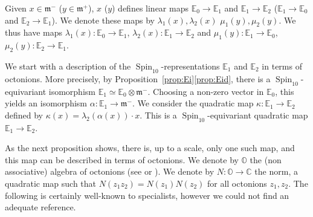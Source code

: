 \documentclass[10pt]{amsart}
\newcommand{\citestar}[3]{\cite[#3]{#1}}
\theoremstyle{plain}
\theoremstyle{definition}
\DeclareMathOperator{\Spin}{Spin}
\newcommand{\bC}{\mathbb{C}}
\newcommand{\bE}{\mathbb{E}}
\newcommand{\bO}{\mathbb{O}}
\newcommand{\fm}{\mathfrak{m}}
\begin{document}
Given $x \in \fm^-$ (\resp $y \in \fm^+$), $x$ (\resp $y$) defines linear maps $\bE_0 \to \bE_1$ and $\bE_1 \to \bE_2$ (\resp $\bE_1 \to \bE_0$ and $\bE_2 \to \bE_1$). We denote these maps by $\lambda_1(x),\lambda_2(x)$
\resp $\mu_1(y),\mu_2(y)$. We thus have maps
$\lambda_1(x):\bE_0 \to \bE_1$, $\lambda_2(x):\bE_1 \to \bE_2$ and
\hbox{$\mu_1(y):\bE_1 \to \bE_0$}, $\mu_2(y):\bE_2 \to \bE_1$.

We start with a description of the $\Spin_{10}$-representations $\bE_1$ and $\bE_2$ in terms of octonions.
More precisely, by Proposition~\ref{prop:Ei}\eqref{prop:Eid}, there is a $\Spin_{10}$-equivariant isomorphism
$\bE_1 \simeq \bE_0 \otimes \fm^-$.
Choosing a non-zero vector in $\bE_0$, this yields an isomorphism $\alpha: \bE_1 \to \fm^-$.
We consider the quadratic map $\kappa: \bE_1 \to \bE_2$ defined by
$\kappa(x)=\lambda_2(\alpha(x)) \cdot x$. This is a $\Spin_{10}$-equivariant quadratic map $\bE_1 \to \bE_2$.

As the next proposition shows, there is, up to a scale, only one such map, and this map
can be described in terms of octonions. We denote by $\bO$ the (non associative) algebra
of octonions (see \citestar{chevalley}*{} or \cite{springer}).
We denote by $N: \bO \to \bC$ the norm, a quadratic map such that
$N(z_1z_2)=N(z_1)N(z_2)$ for all octonions $z_1,z_2$.
The following is certainly well-known to specialists, however we could not find an adequate reference.
\end{document}
